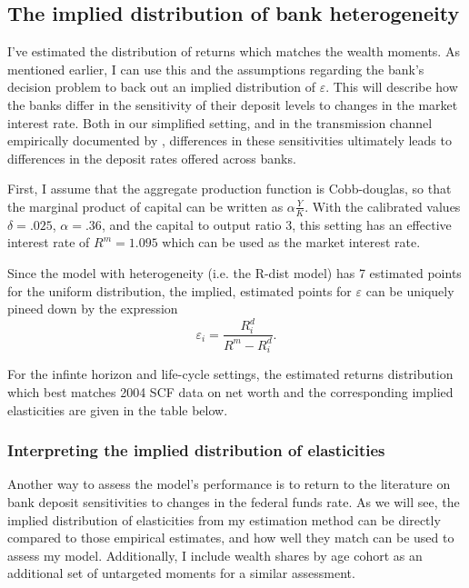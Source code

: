  \subsection{The implied distribution of bank heterogeneity}

  \par I've estimated the distribution of returns which matches the wealth moments. As mentioned earlier, I can use this and the assumptions regarding the bank's decision problem to back out an implied distribution of $\varepsilon$. This will describe how the banks differ in the sensitivity of their deposit levels to changes in the market interest rate. Both in our simplified setting, and in the transmission channel empirically documented by \cite{Drechsler2017}, differences in these sensitivities ultimately leads to differences in the deposit rates offered across banks.  

  \par First, I assume that the aggregate production function is Cobb-douglas, so that the marginal product of capital can be written as $\alpha \frac{Y}{K}$. With the calibrated values  $\delta = .025$, $\alpha = .36$, and the capital to output ratio $3$, this setting has an effective interest rate of $R^m = 1.095$ which can be used as the market interest rate.

  \par Since the model with heterogeneity (i.e. the R-dist model) has 7 estimated points for the uniform distribution, the implied, estimated points for $\varepsilon$ can be uniquely pineed down by the expression $$\varepsilon_i = \frac{R_i^d}{R^m - R_i^d} .$$

  \par For the infinte horizon and life-cycle settings, the estimated returns distribution which best matches 2004 SCF data on net worth and the corresponding implied elasticities are given in the table below. 

   

  \subsubsection{Interpreting the implied distribution of elasticities}

    \par Another way to assess the model's performance is to return to the literature on bank deposit sensitivities to changes in the federal funds rate. As we will see, the implied distribution of elasticities from my estimation method can be directly compared to those empirical estimates, and how well they match can be used to assess my model. Additionally, I include wealth shares by age cohort as an additional set of untargeted moments for a similar assessment.  

